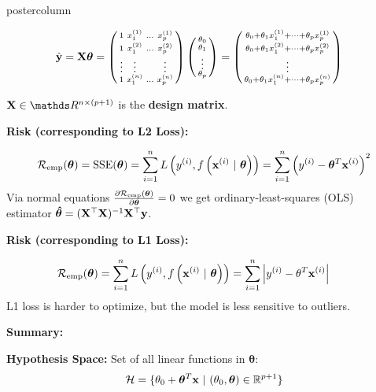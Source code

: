 \documentclass{beamer}
\begin{document}
\begin{frame}[fragile]{}
\begin{columns}
\begin{column}{.31\textwidth}
\begin{beamercolorbox}[center]{postercolumn}
\begin{minipage}{.98\textwidth}
{\begin{myblock}
  \begin{align*}
    \hat {\mathbf{y}} = \mathbf{X} \bm{\theta} = 
        \left(
        \begin{smallmatrix}
            1 & x^{(1)}_1 & \ldots & x^{(1)}_p \\
            1 & x^{(2)}_1 & \ldots & x^{(2)}_p \\
            \vdots & \vdots & & \vdots \\
            1 & x^{(n)}_1 & \ldots & x^{(n)}_p \\
        \end{smallmatrix}
        \right)
        \left(
        \begin{smallmatrix}
            \theta_0 \\ \theta_1 \\ \vdots \\ \theta_p
        \end{smallmatrix}
        \right)
        &=
        \left(
        \begin{smallmatrix}
            \theta_0 + \theta_1 x_1^{(1)} + \dots + \theta_p x_p^{(1)} \\
            \theta_0 + \theta_1 x_1^{(2)} + \dots + \theta_p x_p^{(2)} \\
            \vdots \\
            \theta_0 + \theta_1 x_1^{(n)} + \dots + \theta_p x_p^{(n)} \\
        \end{smallmatrix}
        \right)
    \end{align*}
 
    $\Xmat \in \R^{n \times (p + 1)}$ is the \textbf{design matrix}.

\begin{codebox}
    \textbf{Risk (corresponding to \textbf{L2 Loss}):}
\end{codebox} 
    \[\mathcal{R}_{\text{emp}}(\bm{\theta}) = \operatorname{SSE}(\bm{\theta}) = \sum\limits_{i=1}^n L\left(y^{(i)}, f\left(\mathbf{x}^{(i)} ~|~ \bm{\theta}\right)\right) = \sum\limits_{i=1}^n \left(y^{(i)} - \bm{\theta}^T \mathbf{x}^{(i)}\right)^2\]
    Via normal equations $\frac{\partial{\mathcal{R}_{\text{emp}}(\bm{\theta})}}{\partial \bm{\theta}} = 0$ we get ordinary-least-squares (OLS) estimator
    $\bm{\hat\theta} = (\mathbf{X}^\top \mathbf{X})^{-1} \mathbf{X}^\top \mathbf{y}$.

  \begin{codebox}
  \textbf{Risk (corresponding to \textbf{L1 Loss}):}
  \end{codebox}
  \[
    \mathcal{R}_{\text{emp}}(\bm{\theta}) = \sum\limits_{i=1}^n L\left(y^{(i)}, f\left(\mathbf{x}^{(i)} ~|~ \bm{\theta}\right)\right) = \sum\limits_{i=1}^n \left|y^{(i)} - \theta^T \mathbf{x}^{(i)}\right| \qquad
    \]
  L1 loss is harder to optimize, but the model is less sensitive to outliers.
  
  \begin{codebox}
  \textbf{Summary:}
  \end{codebox}
  \textbf{Hypothesis Space:} Set of all linear functions in $\bm{\theta}$:
  $$\Hspace = \{ \theta_0 + \thetav^T \xv\ |\ (\theta_0, \thetav) \in \mathbb{R}^{p+1} \}$$


\end{myblock}}
\end{minipage}
\end{beamercolorbox}
\end{column}
\end{columns}
\end{frame}
\end{document}
